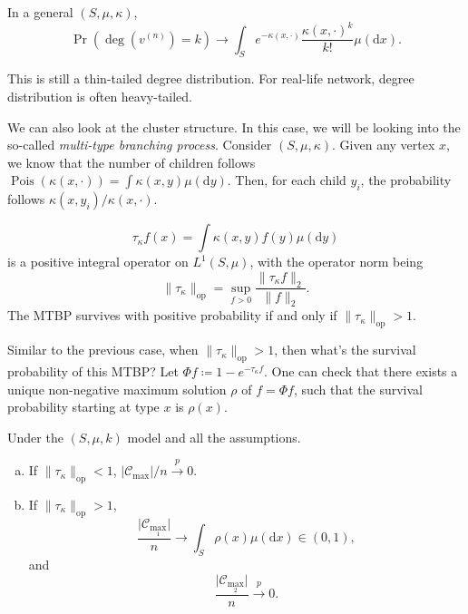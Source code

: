 In a general \((S, \mu , \kappa )\),
\[
	\Pr_{}\left(\deg (v^{(n)}) = k\right)
	\to \int _S e^{-\kappa (x, \cdot)} \frac{\kappa (x, \cdot)^k}{k!} \mu (\mathrm{d} x).
\]
\begin{remark}
	This is still a thin-tailed degree distribution. For real-life network, degree distribution is often heavy-tailed.
\end{remark}

We can also look at the cluster structure. In this case, we will be looking into the so-called \emph{multi-type branching process}. Consider \((S, \mu , \kappa )\). Given any vertex \(x\), we know that the number of children follows \(\operatorname{Pois}(\kappa (x, \cdot)) = \int \kappa (x, y) \mu (\mathrm{d} y)\). Then, for each child \(y_i\), the probability follows \(\kappa (x, y_i) / \kappa (x, \cdot)\).

\begin{intuition}
	\[
		\tau _\kappa f(x)
		= \int \kappa (x, y) f(y) \mu (\mathrm{d} y)
	\]
	is a positive integral operator on \(L^1(S, \mu )\), with the operator norm being
	\[
		\lVert \tau _{\kappa } \rVert _{\mathrm{op} }
		= \sup _{f > 0} \frac{\lVert \tau _\kappa f \rVert _2}{\lVert f \rVert _2}.
	\]
	The MTBP survives with positive probability if and only if \(\lVert \tau _{\kappa } \rVert _{\mathrm{op} } > 1\).

	Similar to the previous case, when \(\lVert \tau _{\kappa } \rVert _{\mathrm{op} } > 1\), then what's the survival probability of this MTBP? Let \(\Phi f \coloneqq 1 - e^{- \tau _{\kappa } f}\). One can check that there exists a unique non-negative maximum solution \(\rho \) of \(f = \Phi f\), such that the survival probability starting at type \(x\) is \(\rho (x)\).

	\begin{theorem}
		Under the \((S, \mu , k)\) model and all the assumptions.
		\begin{enumerate}[(a)]
			\item If \(\lVert \tau _{\kappa } \rVert _{\mathrm{op} } < 1\), \(\lvert \mathcal{C} _{\max } \rvert / n \overset{p}{\to} 0\).
			\item If \(\lVert \tau _{\kappa } \rVert _{\mathrm{op} } > 1\),
			      \[
				      \frac{\lvert \mathcal{C} _{\max _1} \rvert }{n}
				      \to \int _S \rho (x) \mu (\mathrm{d} x) \in (0, 1),
			      \]
			      and
			      \[
				      \frac{\lvert \mathcal{C} _{\max _2} \rvert }{n} \overset{p}{\to} 0.
			      \]
		\end{enumerate}
	\end{theorem}
\end{intuition}

